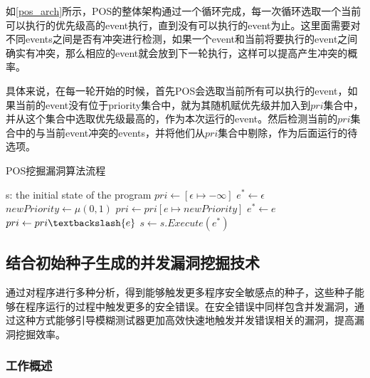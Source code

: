 如\autoref{pos_arch}所示，POS的整体架构通过一个循环完成，每一次循环选取一个当前可以执行的优先级高的event执行，直到没有可以执行的event为止。这里面需要对不同events之间是否有冲突进行检测，如果一个event和当前将要执行的event之间确实有冲突，那么相应的event就会放到下一轮执行，这样可以提高产生冲突的概率。

具体来说，在每一轮开始的时候，首先POS会选取当前所有可以执行的event，如果当前的event没有位于priority集合中，就为其随机赋优先级并加入到$pri$集合中，并从这个集合中选取优先级最高的，作为本次运行的event。然后检测当前的$pri$集合中的与当前event冲突的events，并将他们从$pri$集合中剔除，作为后面运行的待选项。

\begin{algorithm}[!ht]
\caption{POS挖掘漏洞算法流程}
\label{pos_arch}
\begin{algorithmic}[1]
    \REQUIRE  s: the initial state of the program
    \STATE $pri \leftarrow [\epsilon \mapsto -\infty ]$
        \STATE $e^* \leftarrow \epsilon$
                \STATE $newPriority \leftarrow \mu(0, 1)$
                \STATE $pri \leftarrow pri[e \mapsto newPriority]$
            \ENDIF
                \STATE $e^* \leftarrow e$
            \ENDIF
        \ENDFOR
                \STATE $pri \leftarrow pri \textbackslash \{e\}$
            \ENDIF
        \ENDFOR
        \STATE $s \leftarrow s.Execute(e^*)$
    \ENDWHILE
\end{algorithmic}  
\end{algorithm}

\subsection{结合初始种子生成的并发漏洞挖掘技术}

通过对程序进行多种分析，得到能够触发更多程序安全敏感点的种子，这些种子能够在程序运行的过程中触发更多的安全错误。在安全错误中同样包含并发漏洞，通过这种方式能够引导模糊测试器更加高效快速地触发并发错误相关的漏洞，提高漏洞挖掘效率。

\subsubsection{工作概述}

